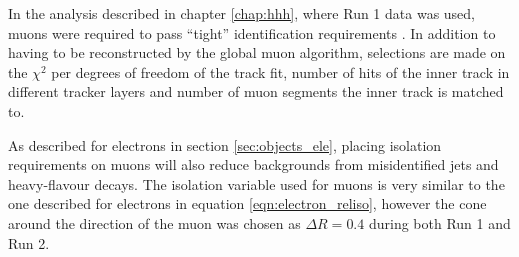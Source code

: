 
In the analysis described in chapter \ref{chap:hhh}, where Run 1 data 
was used, muons were required to pass ``tight'' identification requirements \cite{cms-muon-reco}. 
In addition to having to be reconstructed by the global muon algorithm, selections
are made on the $\chi^2$ per degrees of freedom of the track fit, number of hits of the inner
track in different tracker layers and number of muon segments the inner track is matched to.

As described for electrons in section \ref{sec:objects_ele}, placing isolation 
requirements on muons will also reduce backgrounds from misidentified jets and heavy-flavour
decays. The isolation variable used for muons is very similar to the one described for
electrons in equation \ref{eqn:electron_reliso}, however the cone around the direction of the
muon was chosen as $\Delta R = 0.4$ during both Run 1 and Run 2.

